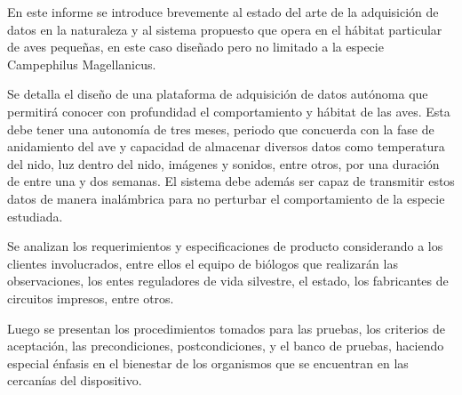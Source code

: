 %

%

En este informe se introduce brevemente al estado del arte de la adquisición de datos en la naturaleza y al sistema propuesto que opera en el hábitat particular de aves pequeñas, en este caso diseñado pero no limitado a la especie Campephilus Magellanicus. 

Se detalla el diseño de una plataforma de adquisición de datos autónoma que permitirá conocer con profundidad el comportamiento y hábitat de las aves. Esta debe tener una autonomía de tres meses, periodo que concuerda con la fase de anidamiento del ave y capacidad de almacenar diversos datos como temperatura del nido, luz dentro del nido, imágenes y sonidos, entre otros, por una duración de entre una y dos semanas. El sistema debe además ser capaz de transmitir estos datos de manera inalámbrica para no perturbar el comportamiento de la especie estudiada.

Se analizan los requerimientos y especificaciones de producto considerando a los clientes involucrados, entre ellos el equipo de biólogos que realizarán las observaciones, los entes reguladores de vida silvestre, el estado, los fabricantes de circuitos impresos, entre otros.

Luego se presentan los procedimientos tomados para las pruebas, los criterios de aceptación, las precondiciones, postcondiciones, y el banco de pruebas, haciendo especial énfasis en el bienestar de los organismos que se encuentran en las cercanías del dispositivo.

%
